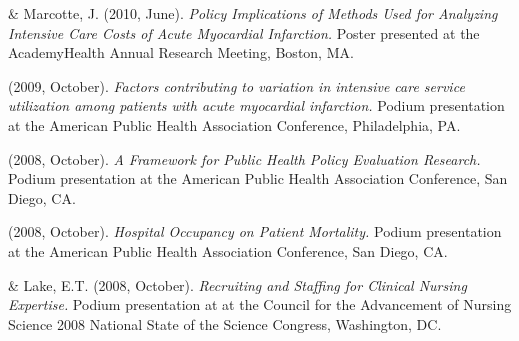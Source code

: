 \documentclass[10pt,]{article}
\begin{document}
{{{{{{{{{{{{{{{\begin{hangparas}{.25in}{1}
\end{hangparas}



\begin{hangparas}{.25in}{1}

 \& Marcotte, J. (2010, June). {\textit {Policy Implications of Methods Used for Analyzing Intensive Care Costs of Acute Myocardial Infarction.}} Poster presented at the AcademyHealth Annual Research Meeting, Boston, MA.

\end{hangparas}



\begin{hangparas}{.25in}{1}

 (2009, October). {\textit {Factors contributing to variation in intensive care service utilization among patients with acute myocardial infarction.}} Podium presentation at the American Public Health Association Conference, Philadelphia, PA.

\end{hangparas}



\begin{hangparas}{.25in}{1}

 (2008, October). {\textit {A Framework for Public Health Policy Evaluation Research.}} Podium presentation at the American Public Health Association Conference, San Diego, CA.

\end{hangparas}



\begin{hangparas}{.25in}{1}

 (2008, October). {\textit {Hospital Occupancy on Patient Mortality.}} Podium presentation at the American Public Health Association Conference, San Diego, CA.

\end{hangparas}



\begin{hangparas}{.25in}{1}

 \& Lake, E.T. (2008, October). {\textit {Recruiting and Staffing for Clinical Nursing Expertise.}} Podium presentation at at the Council for the Advancement of Nursing Science 2008 National State of the Science Congress, Washington, DC.


\end{hangparas}}}}}}}}}}}}}}}}
\end{document}
